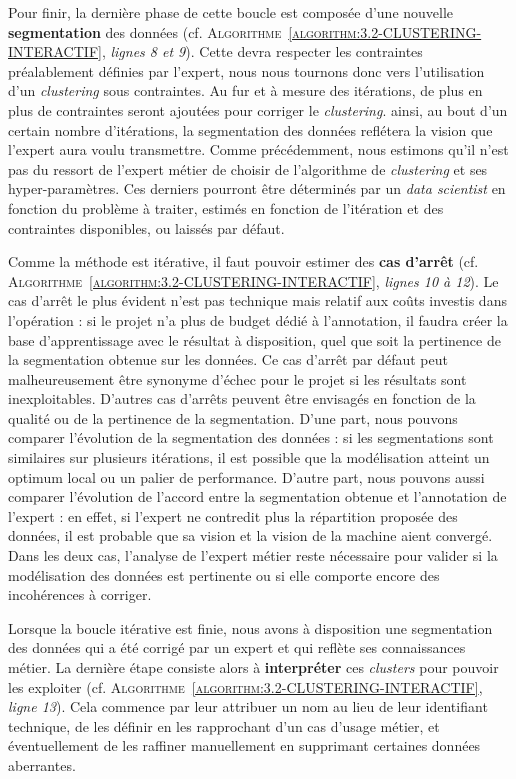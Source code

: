 		Pour finir, la dernière phase de cette boucle est composée d'une nouvelle \textbf{segmentation} des données (cf. \textsc{Algorithme~\ref{algorithm:3.2-CLUSTERING-INTERACTIF}}, \textit{lignes 8 et 9}). Cette devra respecter les contraintes préalablement définies par l'expert, nous nous tournons donc vers l'utilisation d'un \textit{clustering} sous contraintes.
		Au fur et à mesure des itérations, de plus en plus de contraintes seront ajoutées pour corriger le \textit{clustering}. ainsi, au bout d'un certain nombre d'itérations, la segmentation des données reflétera la vision que l'expert aura voulu transmettre.
		Comme précédemment, nous estimons qu'il n'est pas du ressort de l'expert métier de choisir de l'algorithme de \textit{clustering} et ses hyper-paramètres.
		Ces derniers pourront être déterminés par un \textit{data scientist} en fonction du problème à traiter, estimés en fonction de l'itération et des contraintes disponibles, ou laissés par défaut.
		
		Comme la méthode est itérative, il faut pouvoir estimer des \textbf{cas d'arrêt} (cf. \textsc{Algorithme~\ref{algorithm:3.2-CLUSTERING-INTERACTIF}}, \textit{lignes 10 à 12}).
		Le cas d'arrêt le plus évident n'est pas technique mais relatif aux coûts investis dans l'opération : si le projet n'a plus de budget dédié à l'annotation, il faudra créer la base d'apprentissage avec le résultat à disposition, quel que soit la pertinence de la segmentation obtenue sur les données.
		Ce cas d'arrêt par défaut peut malheureusement être synonyme d'échec pour le projet si les résultats sont inexploitables.
		D'autres cas d'arrêts peuvent être envisagés en fonction de la qualité ou de la pertinence de la segmentation.
		D'une part, nous pouvons comparer l'évolution de la segmentation des données : si les segmentations sont similaires sur plusieurs itérations, il est possible que la modélisation atteint un optimum local ou un palier de performance.
		D'autre part, nous pouvons aussi comparer l'évolution de l'accord entre la segmentation obtenue et l'annotation de l'expert : en effet, si l'expert ne contredit plus la répartition proposée des données, il est probable que sa vision et la vision de la machine aient convergé.
		Dans les deux cas, l'analyse de l'expert métier reste nécessaire pour valider si la modélisation des données est pertinente ou si elle comporte encore des incohérences à corriger.

		Lorsque la boucle itérative est finie, nous avons à disposition une segmentation des données qui a été corrigé par un expert et qui reflète ses connaissances métier.
		La dernière étape consiste alors à \textbf{interpréter} ces \textit{clusters} pour pouvoir les exploiter (cf. \textsc{Algorithme~\ref{algorithm:3.2-CLUSTERING-INTERACTIF}}, \textit{ligne 13}).
		Cela commence par leur attribuer un nom au lieu de leur identifiant technique, de les définir en les rapprochant d'un cas d'usage métier, et éventuellement de les raffiner manuellement en supprimant certaines données aberrantes.
		
